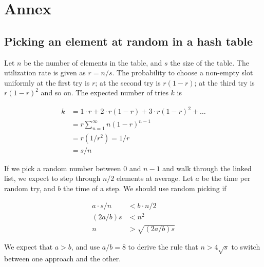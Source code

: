 \section{Annex}

\subsection{Picking an element at random in a hash table}
\label{annex:random-picking}

Let $n$ be the number of elements in the table, and $s$ the size of the table. The utilization rate is given as $r = n/s$.
The probability to choose a non-empty slot uniformly at the first try is $r$; at the second try is $r(1-r)$; at the third try
is $r(1-r)^2$ and so on. The expected number of tries $k$ is 

\begin{align*}
 k &= 1 \cdot r + 2 \cdot r(1-r) + 3 \cdot r(1-r)^2 + \ldots \\
   &= r \sum_{n=1}^\infty n (1-r)^{n-1} \\
   &= r (1/r^2) = 1/r \\
   &= s/n
\end{align*}

If we pick a random number between 0 and $n-1$ and walk through the linked list, we expect to step through $n/2$ elements at average. 
Let $a$ be the time per random try, and $b$ the time of a step. We should use random picking if 

\begin{align*}
 a \cdot s/n &< b \cdot n/2 \\
  (2a/b)s    &< n^2 \\
        n    &> \sqrt{(2a/b)s}
\end{align*}

We expect that $a>b$, and use $a/b = 8$ to derive the rule that $n > 4\sqrt{s}$ to switch between one approach and the other. 
